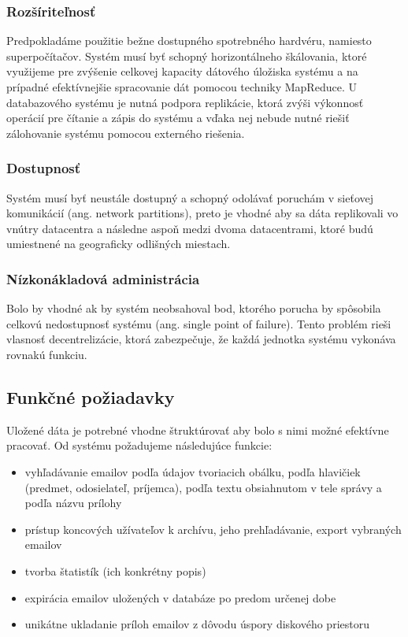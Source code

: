 \documentclass[11pt,twoside,a4paper]{book}
\begin{document}
\subsubsection{Rozšíriteľnosť}
Predpokladáme použitie bežne dostupného spotrebného hardvéru, namiesto superpočítačov. Systém musí byť schopný horizontálneho škálovania, ktoré využijeme pre zvýšenie celkovej kapacity dátového úložiska systému a na prípadné efektívnejšie spracovanie dát pomocou techniky MapReduce. U databazového systému je nutná podpora replikácie, ktorá zvýši výkonnosť operácií pre čítanie a zápis do systému a vďaka nej nebude nutné riešiť zálohovanie systému pomocou externého riešenia.

\subsubsection{Dostupnosť}
Systém musí byť neustále dostupný a schopný odolávať poruchám v sieťovej komunikácií (ang. network partitions), preto je vhodné aby sa dáta replikovali vo vnútry datacentra a následne aspoň medzi dvoma datacentrami, ktoré budú umiestnené na geograficky odlišných miestach.

\subsubsection{Nízkonákladová administrácia}
Bolo by vhodné ak by systém neobsahoval bod, ktorého porucha by spôsobila celkovú nedostupnosť systému (ang. single point of failure). Tento problém rieši vlasnosť decentrelizácie, ktorá zabezpečuje, že každá jednotka systému vykonáva rovnakú funkciu.

\subsection{Funkčné požiadavky}

Uložené dáta je potrebné vhodne štruktúrovať aby bolo s nimi možné efektívne pracovať. Od systému požadujeme následujúce funkcie:

\begin{itemize}
 \item
  vyhľadávanie emailov podľa údajov tvoriacich obálku, podľa hlavičiek (predmet, odosielateľ, príjemca), podľa textu obsiahnutom v tele správy a podľa názvu prílohy
 \item
  prístup koncových užívateľov k archívu, jeho prehľadávanie, export vybraných emailov
 \item
  tvorba štatistík (ich konkrétny popis)
 \item
  expirácia emailov uložených v databáze po predom určenej dobe
 \item
  unikátne ukladanie príloh emailov z dôvodu úspory diskového priestoru
\end{itemize}
\end{document}
